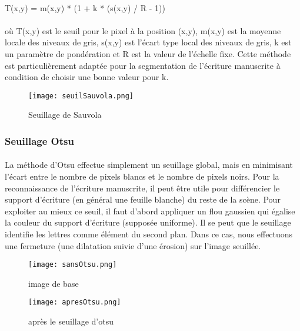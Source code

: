 \documentclass[a4paper]{article}
\begin{document}
				\paragraph{} \hspace*{0.4\linewidth}			T(x,y) = m(x,y) * (1 + k * (s(x,y) / R - 1))
				\paragraph{} où T(x,y) est le seuil pour le pixel à la position (x,y), m(x,y) est la moyenne locale des niveaux de gris, s(x,y) est l'écart type local des niveaux de gris, k est un paramètre de pondération et R est la valeur de l'échelle fixe.
				Cette méthode est particulièrement adaptée pour la segmentation de l'écriture manuscrite à condition de choisir une bonne valeur pour k. 

				\vspace*{1cm}


				\begin{figure}[h!]
					\centering
					\texttt{[image: seuilSauvola.png]}
					\caption{Seuillage de Sauvola}
					\label{fig:seuilSauvola}
				\end{figure}


				\hspace*{1.5cm}

				\subsubsection{Seuillage Otsu}
				\paragraph{} La méthode d'Otsu effectue simplement un seuillage global, mais en minimisant l'écart entre le nombre de pixels blancs et le nombre de pixels noirs. Pour la reconnaissance de l'écriture manuscrite, il peut être utile pour différencier le support d'écriture (en général une feuille blanche) du reste de la scène.
				Pour exploiter au mieux ce seuil, il faut d'abord appliquer un flou gaussien qui égalise la couleur du support d'écriture (supposée uniforme). 
				Il se peut que le seuillage identifie les lettres comme élément du second plan. Dans ce cas, nous effectuons une fermeture (une dilatation suivie d'une érosion) sur l'image seuillée.
				
				
				\hspace*{1.5cm}
				\begin{figure}[h!]
					\centering
					\begin{minipage}{.5\textwidth}
					  \centering
					  \texttt{[image: sansOtsu.png]}
					  \caption{image de base}
					  \label{fig:sansOtsu}
					\end{minipage}%
					\begin{minipage}{.5\textwidth}
					  \centering
					  \texttt{[image: apresOtsu.png]}
					  \caption{après le seuillage d'otsu}
					  \label{fig:apresOtsu}
					\end{minipage}
				\end{figure}
\end{document}
